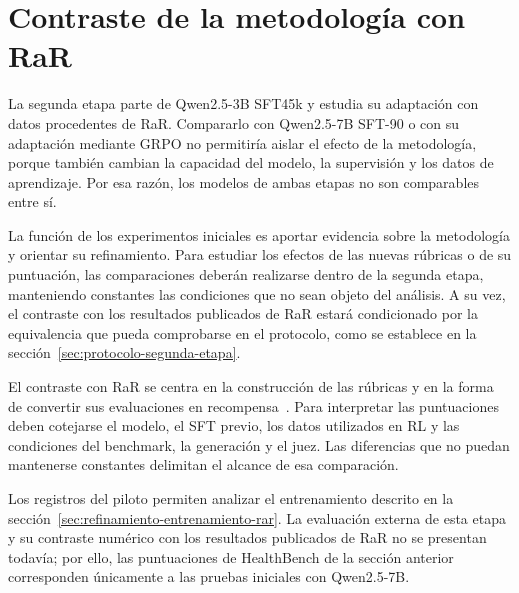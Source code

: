 \section{Contraste de la metodología con RaR}
\label{sec:comparacion-rar}
\label{sec:resultados-modelos}
La segunda etapa parte de Qwen2.5-3B SFT45k y estudia su adaptación con datos procedentes de RaR. Compararlo con Qwen2.5-7B SFT-90 o con su adaptación mediante GRPO no permitiría aislar el efecto de la metodología, porque también cambian la capacidad del modelo, la supervisión y los datos de aprendizaje. Por esa razón, los modelos de ambas etapas no son comparables entre sí.

La función de los experimentos iniciales es aportar evidencia sobre la metodología y orientar su refinamiento. Para estudiar los efectos de las nuevas rúbricas o de su puntuación, las comparaciones deberán realizarse dentro de la segunda etapa, manteniendo constantes las condiciones que no sean objeto del análisis. A su vez, el contraste con los resultados publicados de RaR estará condicionado por la equivalencia que pueda comprobarse en el protocolo, como se establece en la sección~\ref{sec:protocolo-segunda-etapa}.

El contraste con RaR se centra en la construcción de las rúbricas y en la forma de convertir sus evaluaciones en recompensa~\cite{gunjal2025rar}. Para interpretar las puntuaciones deben cotejarse el modelo, el SFT previo, los datos utilizados en RL y las condiciones del benchmark, la generación y el juez. Las diferencias que no puedan mantenerse constantes delimitan el alcance de esa comparación.

Los registros del piloto permiten analizar el entrenamiento descrito en la sección~\ref{sec:refinamiento-entrenamiento-rar}. La evaluación externa de esta etapa y su contraste numérico con los resultados publicados de RaR no se presentan todavía; por ello, las puntuaciones de HealthBench de la sección anterior corresponden únicamente a las pruebas iniciales con Qwen2.5-7B.

